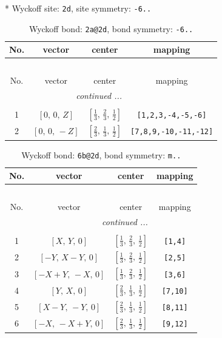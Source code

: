 \documentclass[fleqn,8pt]{jsarticle}
\begin{document}
* Wyckoff site: {\tt 2d}, site symmetry: {\tt -6..}
\renewcommand{\arraystretch}{1.2}
\begin{longtable}{cccc}
\caption{Wyckoff bond: {\tt 2a@2d}, bond symmetry: {\tt -6..}}
 \\
 \hline \hline
No. & vector & center & mapping \\ \hline \endfirsthead

\multicolumn{3}{l}{\tablename\ \thetable{}} \\
 \hline \hline
No. & vector & center & mapping \\ \hline \endhead

 \hline \hline
\multicolumn{3}{r}{\footnotesize\it continued ...} \\ \endfoot

 \hline \hline
\multicolumn{3}{r}{} \\ \endlastfoot

1 & $\left[ 0,\, 0,\, Z \right]$ & $\left[ \frac{1}{3},\, \frac{2}{3},\, \frac{1}{2} \right]$ & {\tt [1,2,3,-4,-5,-6]} \\ \hline
2 & $\left[ 0,\, 0,\, - Z \right]$ & $\left[ \frac{2}{3},\, \frac{1}{3},\, \frac{1}{2} \right]$ & {\tt [7,8,9,-10,-11,-12]} \\
\end{longtable}
\renewcommand{\arraystretch}{1.2}
\begin{longtable}{cccc}
\caption{Wyckoff bond: {\tt 6b@2d}, bond symmetry: {\tt m..}}
 \\
 \hline \hline
No. & vector & center & mapping \\ \hline \endfirsthead

\multicolumn{3}{l}{\tablename\ \thetable{}} \\
 \hline \hline
No. & vector & center & mapping \\ \hline \endhead

 \hline \hline
\multicolumn{3}{r}{\footnotesize\it continued ...} \\ \endfoot

 \hline \hline
\multicolumn{3}{r}{} \\ \endlastfoot

1 & $\left[ X,\, Y,\, 0 \right]$ & $\left[ \frac{1}{3},\, \frac{2}{3},\, \frac{1}{2} \right]$ & {\tt [1,4]} \\ \hline
2 & $\left[ - Y,\, X - Y,\, 0 \right]$ & $\left[ \frac{1}{3},\, \frac{2}{3},\, \frac{1}{2} \right]$ & {\tt [2,5]} \\ \hline
3 & $\left[ - X + Y,\, - X,\, 0 \right]$ & $\left[ \frac{1}{3},\, \frac{2}{3},\, \frac{1}{2} \right]$ & {\tt [3,6]} \\ \hline
4 & $\left[ Y,\, X,\, 0 \right]$ & $\left[ \frac{2}{3},\, \frac{1}{3},\, \frac{1}{2} \right]$ & {\tt [7,10]} \\ \hline
5 & $\left[ X - Y,\, - Y,\, 0 \right]$ & $\left[ \frac{2}{3},\, \frac{1}{3},\, \frac{1}{2} \right]$ & {\tt [8,11]} \\ \hline
6 & $\left[ - X,\, - X + Y,\, 0 \right]$ & $\left[ \frac{2}{3},\, \frac{1}{3},\, \frac{1}{2} \right]$ & {\tt [9,12]} \\
\end{longtable}
\end{document}
